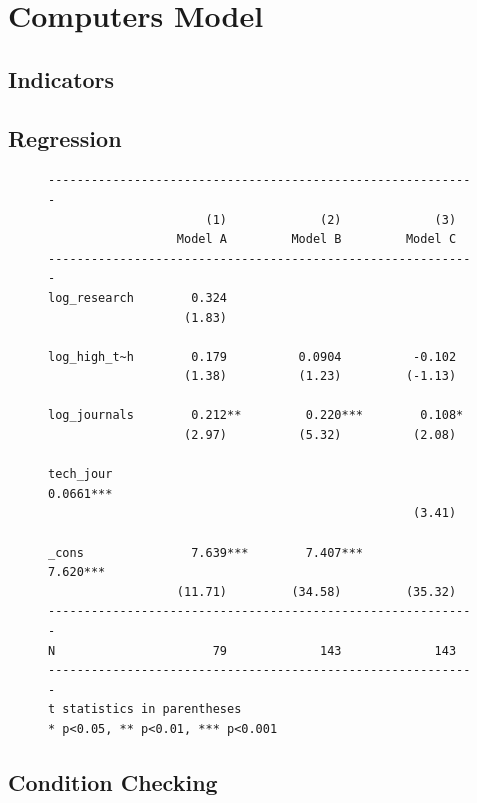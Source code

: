 \documentclass[12pt]{article}
\begin{document}
\section{Computers Model}

\subsection{Indicators}

\subsection{Regression}

\begin{figure}[h!]
\begin{singlespace}
\small
\begin{verbatim}
------------------------------------------------------------
                      (1)             (2)             (3)
                  Model A         Model B         Model C
------------------------------------------------------------
log_research        0.324
                   (1.83)

log_high_t~h        0.179          0.0904          -0.102
                   (1.38)          (1.23)         (-1.13)

log_journals        0.212**         0.220***        0.108*
                   (2.97)          (5.32)          (2.08)

tech_jour                                          0.0661***
                                                   (3.41)

_cons               7.639***        7.407***        7.620***
                  (11.71)         (34.58)         (35.32)
------------------------------------------------------------
N                      79             143             143
------------------------------------------------------------
t statistics in parentheses
* p<0.05, ** p<0.01, *** p<0.001
\end{verbatim}
\end{singlespace}
\end{figure}



\subsection{Condition Checking}
\end{document}

